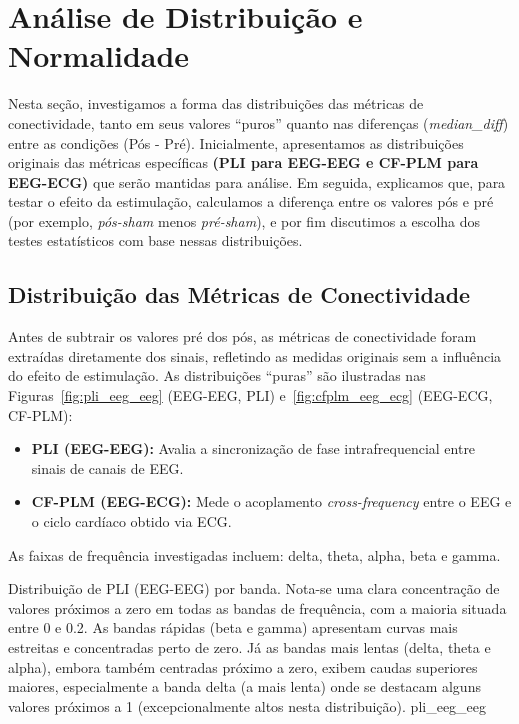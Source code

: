 \chapter{Análise de Distribuição e Normalidade}
\label{chap:analise_distribuicao_normalidade}
Nesta seção, investigamos a forma das distribuições das métricas de conectividade, tanto em seus valores ``puros'' quanto nas diferenças (\textit{median\_diff}) entre as condições (Pós - Pré). Inicialmente, apresentamos as distribuições originais das métricas específicas \textbf{(PLI para EEG-EEG e CF-PLM para EEG-ECG)} que serão mantidas para análise. Em seguida, explicamos que, para testar o efeito da estimulação, calculamos a diferença entre os valores pós e pré (por exemplo, \emph{pós-sham} menos \emph{pré-sham}), e por fim discutimos a escolha dos testes estatísticos com base nessas distribuições.

\section{Distribuição das Métricas de Conectividade}
Antes de subtrair os valores pré dos pós, as métricas de conectividade foram extraídas diretamente dos sinais, refletindo as medidas originais sem a influência do efeito de estimulação. As distribuições ``puras'' são ilustradas nas Figuras~\ref{fig:pli_eeg_eeg} (EEG-EEG, PLI) e~\ref{fig:cfplm_eeg_ecg} (EEG-ECG, CF-PLM):
\begin{itemize}
    \item \textbf{PLI (EEG-EEG):} Avalia a sincronização de fase intrafrequencial entre sinais de canais de EEG.
    \item \textbf{CF-PLM (EEG-ECG):} Mede o acoplamento \textit{cross-frequency} entre o EEG e o ciclo cardíaco obtido via ECG.
\end{itemize}

As faixas de frequência investigadas incluem: delta, theta, alpha, beta e gamma.

{Distribuição de PLI (EEG-EEG) por banda. Nota-se uma clara concentração de valores próximos a zero em todas as bandas de frequência, com a maioria situada entre 0 e 0.2. As bandas rápidas (beta e gamma) apresentam curvas mais estreitas e concentradas perto de zero. Já as bandas mais lentas (delta, theta e alpha), embora também centradas próximo a zero, exibem caudas superiores maiores, especialmente a banda delta (a mais lenta) onde se destacam alguns valores próximos a 1 (excepcionalmente altos nesta distribuição).}
{pli_eeg_eeg}


